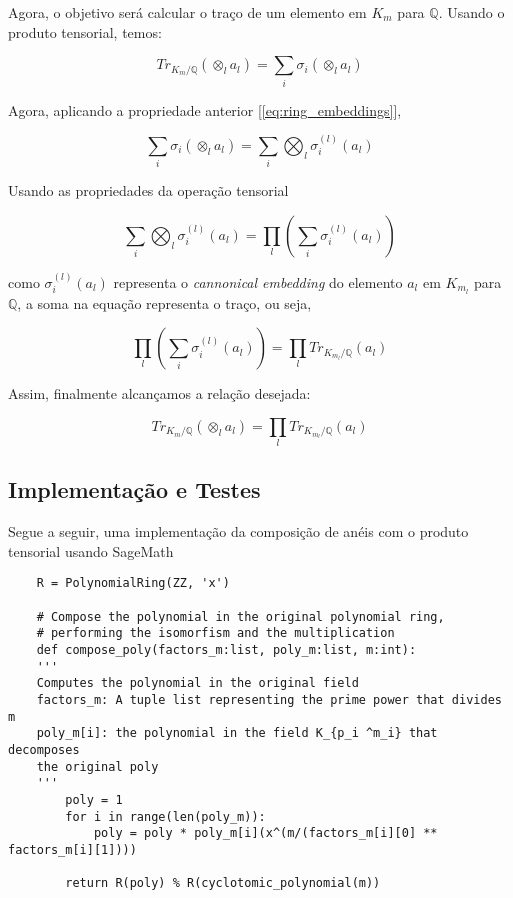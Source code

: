 Agora, o objetivo será calcular o traço de um elemento em $K_m$ para $\mathbb{Q}$. Usando o produto tensorial, temos:

\begin{equation}
    Tr_{K_m/\mathbb{Q}}(\otimes_l a_l)  = \sum_i \sigma_i(\otimes_l a_l) 
\end{equation}

Agora, aplicando a propriedade anterior [\ref{eq:ring_embeddings}],  

\begin{equation}
    \sum_i \sigma_i(\otimes_l a_l)  = \sum_i \bigotimes_l \sigma_i^{(l)}(a_l)
\end{equation}

Usando as propriedades da operação tensorial 

\begin{equation}
    \sum_i \bigotimes_l \sigma_i^{(l)}(a_l) = \prod_l (\sum_i \sigma_i^{(l)}(a_l))
\end{equation}

como $\sigma_i^{(l)}(a_l)$ representa o \textit{cannonical embedding} do elemento $a_l$ em $K_{m_l}$ para $\mathbb{Q}$, a soma na equação representa o traço, ou seja,    
 
\begin{equation}
    \prod_l (\sum_i \sigma_i^{(l)}(a_l)) = \prod_l Tr_{K_{m_l}/\mathbb{Q}} (a_l)
\end{equation}

Assim, finalmente alcançamos a relação desejada: 

\begin{equation}
    \label{eq:trace_composition}
    Tr_{K_m/\mathbb{Q}}(\otimes_l a_l) = \prod_l Tr_{K_{m_l}/\mathbb{Q}} (a_l)
\end{equation}

\subsection{Implementação e Testes}

Segue a seguir, uma implementação da composição de anéis com o produto tensorial usando SageMath

\begin{verbatim}
    R = PolynomialRing(ZZ, 'x')

    # Compose the polynomial in the original polynomial ring,
    # performing the isomorfism and the multiplication
    def compose_poly(factors_m:list, poly_m:list, m:int):
    '''
    Computes the polynomial in the original field
    factors_m: A tuple list representing the prime power that divides m
    poly_m[i]: the polynomial in the field K_{p_i ^m_i} that decomposes 
    the original poly 
    '''
        poly = 1
        for i in range(len(poly_m)):
            poly = poly * poly_m[i](x^(m/(factors_m[i][0] ** factors_m[i][1])))

        return R(poly) % R(cyclotomic_polynomial(m))
\end{verbatim}

